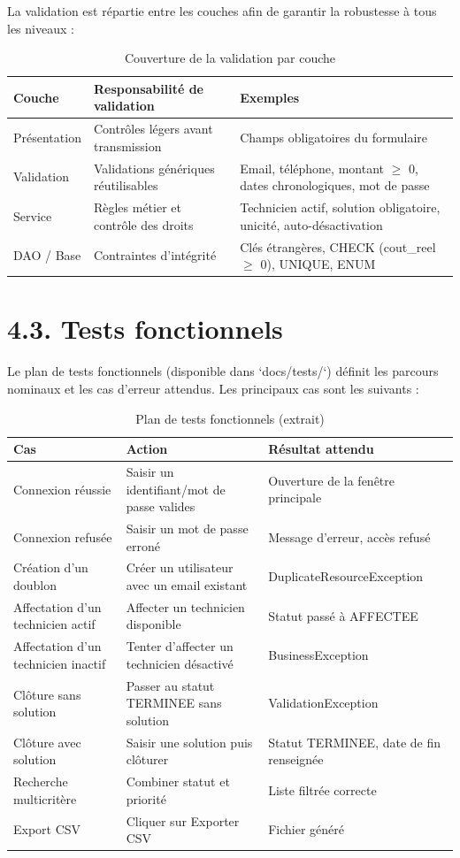 \documentclass[11pt,a4paper]{report}
\begin{document}
La validation est répartie entre les couches afin de garantir la robustesse à tous les niveaux :
\begin{table}[htbp]\centering\small
\begin{tabularx}{\textwidth}{|X|X|X|}
\hline\rowcolor{hdr}\textbf{Couche} & \textbf{Responsabilité de validation} & \textbf{Exemples}\\ \hline
Présentation & Contrôles légers avant transmission & Champs obligatoires du formulaire\\ \hline
Validation & Validations génériques réutilisables & Email, téléphone, montant $\geq$ 0, dates chronologiques, mot de passe\\ \hline
Service & Règles métier et contrôle des droits & Technicien actif, solution obligatoire, unicité, auto-désactivation\\ \hline
DAO / Base & Contraintes d'intégrité & Clés étrangères, CHECK (cout\_reel $\geq$ 0), UNIQUE, ENUM\\ \hline
\end{tabularx}
\caption{Couverture de la validation par couche}
\end{table}
\section*{4.3. Tests fonctionnels}

Le plan de tests fonctionnels (disponible dans `docs/tests/`) définit les parcours nominaux et les cas d'erreur attendus. Les principaux cas sont les suivants :
\begin{table}[htbp]\centering\small
\begin{tabularx}{\textwidth}{|X|X|X|}
\hline\rowcolor{hdr}\textbf{Cas} & \textbf{Action} & \textbf{Résultat attendu}\\ \hline
Connexion réussie & Saisir un identifiant/mot de passe valides & Ouverture de la fenêtre principale\\ \hline
Connexion refusée & Saisir un mot de passe erroné & Message d'erreur, accès refusé\\ \hline
Création d'un doublon & Créer un utilisateur avec un email existant & DuplicateResourceException\\ \hline
Affectation d'un technicien actif & Affecter un technicien disponible & Statut passé à AFFECTEE\\ \hline
Affectation d'un technicien inactif & Tenter d'affecter un technicien désactivé & BusinessException\\ \hline
Clôture sans solution & Passer au statut TERMINEE sans solution & ValidationException\\ \hline
Clôture avec solution & Saisir une solution puis clôturer & Statut TERMINEE, date de fin renseignée\\ \hline
Recherche multicritère & Combiner statut et priorité & Liste filtrée correcte\\ \hline
Export CSV & Cliquer sur Exporter CSV & Fichier généré\\ \hline
\end{tabularx}
\caption{Plan de tests fonctionnels (extrait)}
\end{table}
\end{document}

